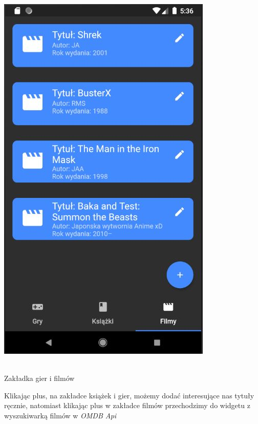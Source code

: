 \documentclass[12pt,a4paper]{article}
\begin{document}
\begin{center}
        \includegraphics[scale=0.70]{4.JPG}
            \begin{scriptsize}
            \\ Zakładka gier i filmów
            \end{scriptsize}
    \end{center}
    Klikając plus, na zakładce książek i gier, możemy dodać interesujące nas tytuły ręcznie, natomiast klikając plus w zakładce filmów przechodzimy do widgetu z wyszukiwarką filmów w \textit{OMDB Api}
\end{document}

